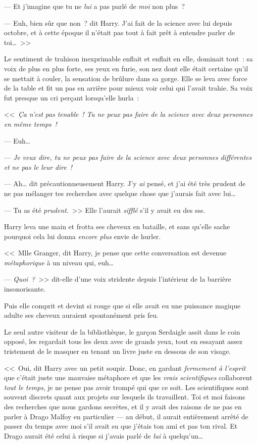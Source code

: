 --- Et j'imagine que tu ne \emph{lui} a pas parlé de \emph{moi} non plus~?

--- Euh, bien sûr que non~? dit Harry. J'ai fait de la science avec lui depuis octobre, et à cette époque il n'était pas tout à fait prêt à entendre parler de toi…~>>

Le sentiment de trahison inexprimable enflait et enflait en elle, dominait tout~: sa voix de plus en plus forte, ses yeux en furie, son nez dont elle était certaine qu'il se mettait à couler, la sensation de brûlure dans sa gorge. Elle se leva avec force de la table et fit un pas en arrière pour mieux voir celui qui l'avait trahie. Sa voix fut presque un cri perçant lorsqu'elle hurla~:

<<~\emph{Ça n'est pas tenable~! Tu ne peux pas faire de la science avec deux personnes en même temps~!}

--- Euh…

--- \emph{Je veux dire, tu ne peux pas faire de la science avec deux personnes différentes et ne pas le leur dire~!}

--- Ah… dit précautionneusement Harry. J'y \emph{ai} pensé, et j'ai été très prudent de ne pas mélanger tes recherches avec quelque chose que j'aurais fait avec lui…

--- Tu as été \emph{prudent}.~>> Elle l'aurait \emph{sifflé} s'il y avait eu des sss.

Harry leva une main et frotta ses cheveux en bataille, et sans qu'elle sache pourquoi cela lui donna \emph{encore plus} envie de hurler.

<<~Mlle Granger, dit Harry, je pense que cette conversation est devenue \emph{métaphorique} à un niveau qui, euh…

--- \emph{Quoi~?}~>> dit-elle d'une voix stridente depuis l'intérieur de la barrière insonorisante.

Puis elle comprit et devint si rouge que si elle avait eu une puissance magique adulte ses cheveux auraient spontanément pris feu.

Le seul autre visiteur de la bibliothèque, le garçon Serdaigle assit dans le coin opposé, les regardait tous les deux avec de grands yeux, tout en essayant assez tristement de le masquer en tenant un livre juste en dessous de son visage.

<<~Oui, dit Harry avec un petit soupir. Donc, en gardant \emph{fermement à l'esprit} que c'était juste une mauvaise métaphore et que les \emph{vrais scientifiques} collaborent \emph{tout le temps}, je ne pense pas avoir trompé qui que ce soit. Les scientifiques sont souvent discrets quant aux projets sur lesquels ils travaillent. Toi et moi faisons des recherches que nous gardons secrètes, et il y avait des raisons de ne pas en parler à Drago Malfoy en particulier — au début, il aurait entièrement arrêté de passer du temps avec moi s'il avait su que j'étais ton ami et pas ton rival. Et Drago aurait été celui à risque si j'avais parlé de \emph{lui} à quelqu'un…

